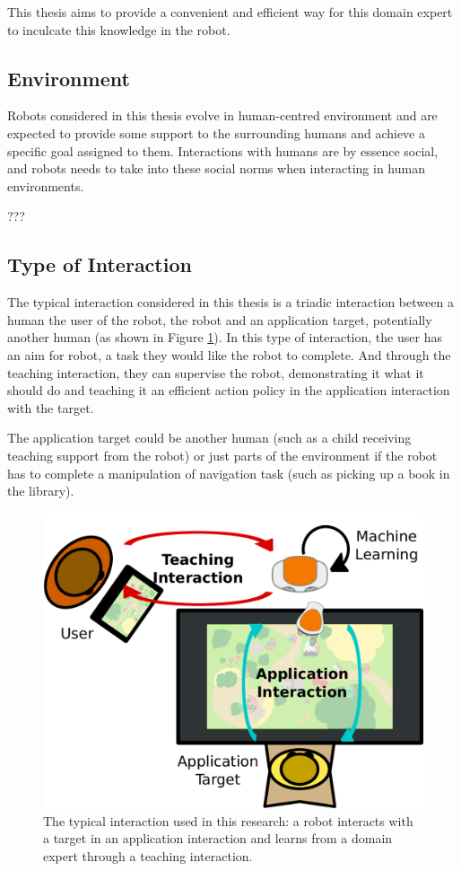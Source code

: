 This thesis aims to provide a convenient and efficient way for this domain expert to inculcate this knowledge in the robot.


\subsection{Environment} 

Robots considered in this thesis evolve in human-centred environment and are expected to provide some support to the surrounding humans and achieve a specific goal assigned to them. Interactions with humans are by essence social, and robots needs to take into these social norms when interacting in human environments.

???

\subsection{Type of Interaction}

The typical interaction considered in this thesis is a triadic interaction between a human the user of the robot, the robot and an application target, potentially another human (as shown in Figure \ref{fig:intro_setup}). In this type of interaction, the user has an aim for robot, a task they would like the robot to complete. And through the teaching interaction, they can supervise the robot, demonstrating it what it should do and teaching it an efficient action policy in the application interaction with the target.

The application target could be another human (such as a child receiving teaching support from the robot) or just parts of the environment if the robot has to complete a manipulation of navigation task (such as picking up a book in the library).

\begin{figure}[ht]
	\includegraphics[width=.7\linewidth]{setup.pdf}
	\centering
	\caption{The typical interaction used in this research: a robot interacts with a target in an application interaction and learns from a domain expert through a teaching interaction.}
	\label{fig:intro_setup}
\end{figure}

